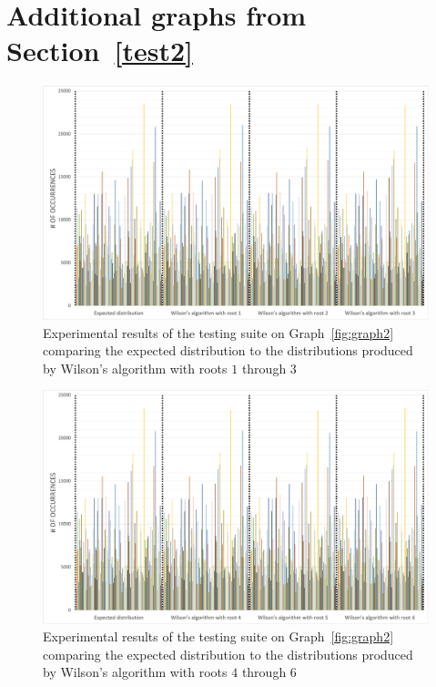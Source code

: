 \documentclass[11pt]{article}
\begin{document}
\begin{appendices}\label{appendix}

\section{Additional graphs from Section~\ref{test2}}\label{appendix1}

\begin{figure}[ht]
\includegraphics[scale=0.40]{fig4.png}
\caption{Experimental results of the testing suite on Graph~\ref{fig:graph2} comparing the expected distribution to the distributions produced by Wilson's algorithm with roots $1$ through $3$}
\centering
\label{fig4}
\end{figure}

\begin{figure}[ht]
\includegraphics[scale=0.40]{fig5.png}
\caption{Experimental results of the testing suite on Graph~\ref{fig:graph2} comparing the expected distribution to the distributions produced by Wilson's algorithm with roots $4$ through $6$}
\centering
\label{fig5}
\end{figure}

\end{appendices}
\end{document}
